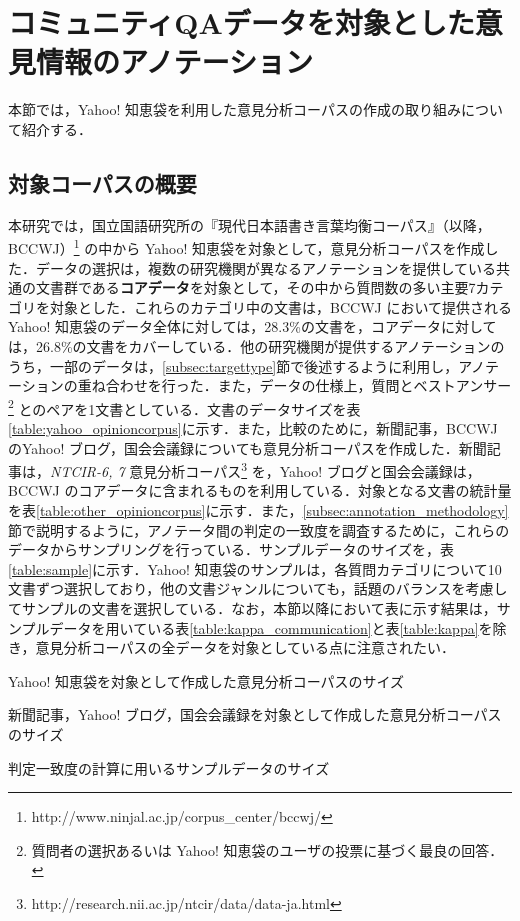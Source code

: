 \documentclass[japanese]{jnlp_1.4}
\begin{document}
\section{コミュニティQAデータを対象とした意見情報のアノテーション}
\label{sec:corpus}

本節では，Yahoo! 知恵袋を利用した意見分析コーパスの作成の取り組みについて紹介する．


\subsection{対象コーパスの概要}
\label{subsec:corpus}

本研究では，国立国語研究所の『現代日本語書き言葉均衡コーパス』（以降，BCCWJ）\cite{maekawa2011bccwj,yamasaki2011bccwj,bccwj2012}\footnote{http://www.ninjal.ac.jp/corpus\_center/bccwj/} の中から Yahoo! 知恵袋を対象として，意見分析コーパスを作成した．データの選択は，複数の研究機関が異なるアノテーションを提供している共通の文書群である{\bf コアデータ}を対象として，その中から質問数の多い主要7カテゴリを対象とした．これらのカテゴリ中の文書は，BCCWJ において提供される Yahoo! 知恵袋のデータ全体に対しては，28.3\%の文書を，コアデータに対しては，26.8\%の文書をカバーしている．他の研究機関が提供するアノテーションのうち，一部のデータは，\ref{subsec:targettype}節で後述するように利用し，アノテーションの重ね合わせを行った．また，データの仕様上，質問とベストアンサー\footnote{質問者の選択あるいは Yahoo! 知恵袋のユーザの投票に基づく最良の回答．} とのペアを1文書としている．文書のデータサイズを表\ref{table:yahoo_opinioncorpus}に示す．また，比較のために，新聞記事，BCCWJ のYahoo! ブログ，国会会議録についても意見分析コーパスを作成した．新聞記事は，{\it NTCIR-6, 7} 意見分析コーパス\footnote{http://research.nii.ac.jp/ntcir/data/data-ja.html} を，Yahoo! ブログと国会会議録は，BCCWJ のコアデータに含まれるものを利用している．対象となる文書の統計量を表\ref{table:other_opinioncorpus}に示す．また，\ref{subsec:annotation_methodology}節で説明するように，アノテータ間の判定の一致度を調査するために，これらのデータからサンプリングを行っている．サンプルデータのサイズを，表\ref{table:sample}に示す．Yahoo! 知恵袋のサンプルは，各質問カテゴリについて10文書ずつ選択しており，他の文書ジャンルについても，話題のバランスを考慮してサンプルの文書を選択している．なお，本節以降において表に示す結果は，サンプルデータを用いている表\ref{table:kappa_communication}と表\ref{table:kappa}を除き，意見分析コーパスの全データを対象としている点に注意されたい．

\begin{table}[t]
\caption{Yahoo! 知恵袋を対象として作成した意見分析コーパスのサイズ}
\label{table:yahoo_opinioncorpus}

\end{table}
\begin{table}[t]
\caption{新聞記事，Yahoo! ブログ，国会会議録を対象として作成した意見分析コーパスのサイズ}
\label{table:other_opinioncorpus}

\end{table}
\begin{table}[t]
\caption{判定一致度の計算に用いるサンプルデータのサイズ}
\label{table:sample}

\end{table}
\end{document}
